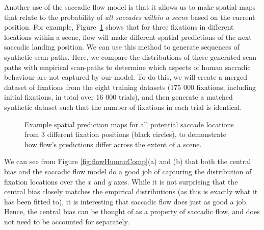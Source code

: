 Another use of the saccadic flow model is that it allows us to make spatial maps that relate to the probability of \emph{all saccades within a scene} based on the current position. For example, Figure~\ref{fig:flowPredict} shows that for three fixations in different locations within a scene, flow will make different spatial predictions of the next saccadic landing position. We can use this method to generate sequences of synthetic scan-paths. Here, we compare the distributions of these generated scan-paths with empirical scan-paths to determine which aspects of human saccadic behaviour are not captured by our model. To do this, we will create a merged dataset of fixations from the eight training datasets (175 000 fixations, including initial fixations, in total over 16 000 trials), and then generate a matched synthetic dataset such that the number of fixations in each trial is identical. 

\begin{figure}[htb]
\centering
{}
\caption[]{Example spatial prediction maps for all potential saccade locations from 3 different fixation positions (black circles), to demonstrate how flow's predictions differ across the extent of a scene.}
\label{fig:flowPredict}
\end{figure}

We can see from Figure \ref{fig:flowHumanComp}(a) and (b) that both the central bias and the saccadic flow model do a good job of capturing the distribution of fixation locations over the $x$ and $y$ axes. While it is not surprising that the central bias closely matches the empirical distributions (as this is exactly what it has been fitted to), it is interesting that saccadic flow does just as good a job. Hence, the central bias can be thought of as a property of saccadic flow, and does not need to be accounted for separately. 

